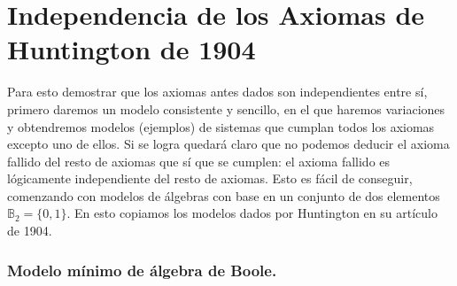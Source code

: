 \chapter{Independencia de los Axiomas de Huntington de 1904}

\newcommand{\setB}{\mathbb{B}}
\newcommand{\mathdef}{\triangleq}
\newcommand{\fromto}{\longrightarrow}
\newcommand{\funcsum}{\vee}
\newcommand{\funcprod}{\wedge}
\newcommand{\funcsumat}[2]{#1 \vee #2}
\newcommand{\funcprodat}[2]{#1 \wedge #2}
\newcommand{\funccomplat}[1]{\neg #1}
\newcommand{\set}[1]{\{#1\}}
\newcommand{\setZ}{\mathbb{Z}}
\newcommand{\bfsf}[1]{\textsf{\textbf{#1}}}





	Para esto demostrar que los axiomas antes dados son independientes entre
sí, primero daremos un modelo consistente y sencillo, en el que haremos
variaciones y obtendremos modelos (ejemplos) de sistemas que cumplan todos
los axiomas excepto uno de ellos. Si se logra quedará claro que no podemos
deducir el axioma fallido del resto de axiomas que sí que se cumplen: el
axioma fallido es lógicamente independiente del resto de axiomas. Esto es
fácil de conseguir, comenzando con modelos de álgebras con base en un
conjunto de dos elementos \({\setB}_2 = \set{0,1}\). En esto copiamos los
modelos dados por Huntington en su artículo de 1904.



\subsection{Modelo mínimo de álgebra de Boole.}



